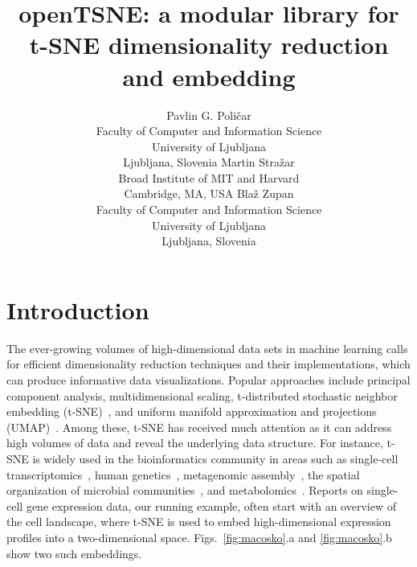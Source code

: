 \documentclass[article]{jss}
\author{
  Pavlin G. Poli\v{c}ar\\
  Faculty of Computer and Information Science\\
  University of Ljubljana\\
  Ljubljana, Slovenia
  \AND
  Martin Stra\v{z}ar\\
  Broad Institute of MIT and Harvard\\
  Cambridge, MA, USA
  \AND
  Bla\v{z} Zupan\\
  Faculty of Computer and Information Science\\
  University of Ljubljana\\
  Ljubljana, Slovenia
}
\title{openTSNE: a modular \proglang{Python} library for t-SNE dimensionality reduction and embedding}
\begin{document}


\section[Introduction]{Introduction} \label{sec:intro}

The ever-growing volumes of high-dimensional data sets in machine learning calls
for efficient dimensionality reduction techniques and their implementations,
which can produce informative data visualizations. Popular approaches include
principal component analysis, multidimensional scaling, t-distributed stochastic
neighbor embedding (t-SNE)~\citep{maaten2008visualizing}, and uniform manifold
approximation and projections (UMAP)~\citep{2018arXivUMAP}. Among these, t-SNE
has received much attention as it can address high volumes of data and reveal
the underlying data structure. For instance, t-SNE is widely used in the
bioinformatics community in areas such as single-cell
transcriptomics~\citep{macosko2015highly,cao2019single,tasic2018shared}, human
genetics~\citep{hirata2019genetic}, metagenomic
assembly~\citep{beaulaurier2018metagenomic}, the spatial organization of
microbial communities~\citep{sheth2019spatial}, and
metabolomics~\citep{tkachev2019differences}. Reports on single-cell gene
expression data, our running example, often start with an overview of the cell
landscape, where t-SNE is used to embed high-dimensional expression profiles
into a two-dimensional space. Figs.~\ref{fig:macosko}.a and \ref{fig:macosko}.b
show two such embeddings.
\end{document}
